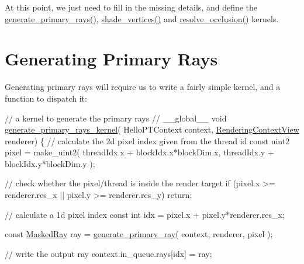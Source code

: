 \begin{DoxyParagraph}{}
At this point, we just need to fill in the missing details, and define the \hyperlink{_hello_renderer_page_HelloPT-generate_primary_rays}{generate\+\_\+primary\+\_\+rays()}, \hyperlink{_hello_renderer_page_shade_vertices_anchor}{shade\+\_\+vertices()} and \hyperlink{_hello_renderer_page_resolve_occlusion_anchor}{resolve\+\_\+occlusion()} kernels.
\end{DoxyParagraph}
\hypertarget{_hello_renderer_page_HelloPTGeneratingPrimaryRaysSection}{}\section{Generating Primary Rays}\label{_hello_renderer_page_HelloPTGeneratingPrimaryRaysSection}
\begin{DoxyParagraph}{}
Generating primary rays will require us to write a fairly simple kernel, and a function to dispatch it\+: \label{_hello_renderer_page_HelloPT-generate_primary_rays}%
%
 ~\newline
 
\begin{DoxyCodeInclude}
\textcolor{comment}{// a kernel to generate the primary rays }
\textcolor{comment}{//}
\_\_global\_\_
\textcolor{keywordtype}{void} \hyperlink{group___p_t_lib_ga9382084c986a4fe52d55f7f225211e66}{generate\_primary\_rays\_kernel}(
    HelloPTContext          context,
    \hyperlink{struct_rendering_context_view}{RenderingContextView}    renderer)
\{
    \textcolor{comment}{// calculate the 2d pixel index given from the thread id}
    \textcolor{keyword}{const} uint2 pixel = make\_uint2(
        threadIdx.x + blockIdx.x*blockDim.x,
        threadIdx.y + blockIdx.y*blockDim.y );

    \textcolor{comment}{// check whether the pixel/thread is inside the render target}
    \textcolor{keywordflow}{if} (pixel.x >= renderer.res\_x || pixel.y >= renderer.res\_y)
        \textcolor{keywordflow}{return};

    \textcolor{comment}{// calculate a 1d pixel index}
    \textcolor{keyword}{const} \textcolor{keywordtype}{int} idx = pixel.x + pixel.y*renderer.res\_x;

    \textcolor{keyword}{const} \hyperlink{struct_masked_ray}{MaskedRay} ray = \hyperlink{group___p_t_lib_core_ga28fe33ab0663b2331fe607662ed07349}{generate\_primary\_ray}( context, renderer, pixel );

    \textcolor{comment}{// write the output ray}
    context.in\_queue.rays[idx] = ray;


\end{DoxyCodeInclude}
\end{DoxyParagraph}
